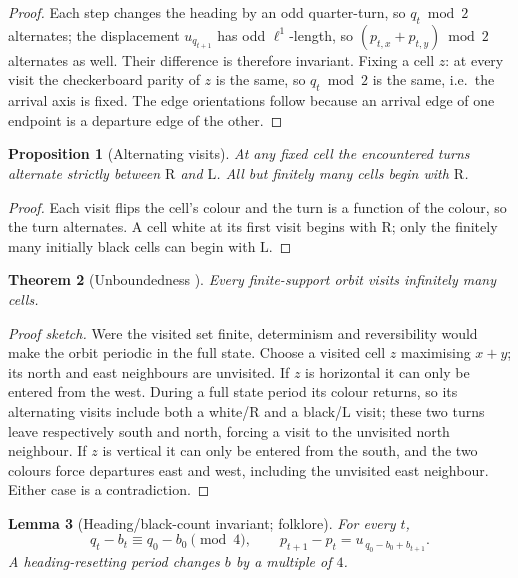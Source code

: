 \documentclass[11pt,reqno]{amsart}
\theoremstyle{plain}
\newtheorem{theorem}{Theorem}[section]
\newtheorem{lemma}[theorem]{Lemma}
\newtheorem{proposition}[theorem]{Proposition}
\theoremstyle{definition}
\newcommand{\turnR}{\mathrm{R}}
\newcommand{\turnL}{\mathrm{L}}
\begin{document}
\begin{proof}
Each step changes the heading by an odd quarter-turn, so $q_t\bmod2$ alternates;
the displacement $u_{q_{t+1}}$ has odd $\ell^1$-length, so $(p_{t,x}+p_{t,y})\bmod2$
alternates as well. Their difference is therefore invariant. Fixing a cell $z$: at
every visit the checkerboard parity of $z$ is the same, so $q_t\bmod2$ is the same,
i.e.\ the arrival axis is fixed. The edge orientations follow because an arrival
edge of one endpoint is a departure edge of the other.
\end{proof}

\begin{proposition}[Alternating visits]\label{prop:alt}
At any fixed cell the encountered turns alternate strictly between $\turnR$ and
$\turnL$. All but finitely many cells begin with $\turnR$.
\end{proposition}

\begin{proof}
Each visit flips the cell's colour and the turn is a function of the colour, so the
turn alternates. A cell white at its first visit begins with $\turnR$; only the
finitely many initially black cells can begin with $\turnL$.
\end{proof}

\begin{theorem}[Unboundedness {\cite{BunimovichTroubetzkoy1992}}]\label{thm:unbounded}
Every finite-support orbit visits infinitely many cells.
\end{theorem}

\begin{proof}[Proof sketch]
Were the visited set finite, determinism and reversibility would make the orbit
periodic in the full state. Choose a visited cell $z$ maximising $x+y$; its north and
east neighbours are unvisited. If $z$ is horizontal it can only be entered from the
west. During a full state period its colour returns, so its alternating visits include
both a white/$\turnR$ and a black/$\turnL$ visit; these two turns leave respectively
south and north, forcing a visit to the unvisited north neighbour. If $z$ is vertical
it can only be entered from the south, and the two colours force departures east and
west, including the unvisited east neighbour. Either case is a contradiction.
\end{proof}

\begin{lemma}[Heading/black-count invariant; folklore]\label{lem:invariant}
For every $t$,
\begin{equation}\label{eq:invariant}
q_t-b_t\equiv q_0-b_0\pmod 4,\qquad p_{t+1}-p_t=u_{\,q_0-b_0+b_{t+1}} .
\end{equation}
A heading-resetting period changes $b$ by a multiple of $4$.
\end{lemma}
\end{document}
